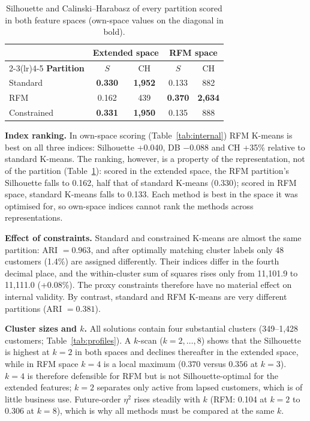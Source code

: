 \documentclass[conference,10pt]{IEEEtran}
\newcommand{\etasq}{\eta^{2}}
\begin{document}
\begin{table}[t]
\centering
\caption{Silhouette and Calinski--Harabasz of every partition scored in
both feature spaces (own-space values on the diagonal in bold).}
\label{tab:cross}
\footnotesize
\setlength{\tabcolsep}{4pt}
\begin{tabular}{lcccc}
\toprule
 & \multicolumn{2}{c}{\textbf{Extended space}} & \multicolumn{2}{c}{\textbf{RFM space}}\\
\cmidrule(lr){2-3}\cmidrule(lr){4-5}
\textbf{Partition} & $S$ & CH & $S$ & CH\\
\midrule
Standard    & \textbf{0.330} & \textbf{1,952} & 0.133 & 882\\
RFM         & 0.162 & 439 & \textbf{0.370} & \textbf{2,634}\\
Constrained & \textbf{0.331} & \textbf{1,950} & 0.135 & 888\\
\bottomrule
\end{tabular}
\end{table}

\textbf{Index ranking.} In own-space scoring (Table~\ref{tab:internal}) RFM K-means is best on all three indices: Silhouette
+0.040, DB $-0.088$ and CH +35\% relative to standard K-means. The ranking,
however, is a property of the representation, not of the partition
(Table~\ref{tab:cross}): scored in the extended space, the RFM partition's
Silhouette falls to 0.162, half that of standard K-means (0.330); scored in
RFM space, standard K-means falls to 0.133. Each method is best in the space
it was optimised for, so own-space indices cannot rank the methods across
representations.


\textbf{Effect of constraints.} Standard and constrained K-means are almost the same
partition: ARI $=0.963$, and after optimally matching cluster labels only
48 customers (1.4\%) are assigned differently. Their indices differ in the
fourth decimal place, and the within-cluster sum of squares rises only from
11,101.9 to 11,111.0 (+0.08\%). The proxy constraints therefore have no
material effect on internal validity. By contrast, standard and RFM K-means
are very different partitions (ARI $=0.381$).

\textbf{Cluster sizes and $k$.} All solutions contain four substantial clusters (349--1,428
customers; Table~\ref{tab:profiles}). A $k$-scan ($k=2,\dots,8$) shows
that the Silhouette is highest at $k=2$ in both spaces and declines
thereafter in the extended space, while in RFM space $k=4$ is a local maximum
($0.370$ versus $0.356$ at $k=3$). $k=4$ is therefore defensible for RFM but
is not Silhouette-optimal for the extended features; $k=2$ separates only
active from lapsed customers, which is of little business use. Future-order
$\etasq$ rises steadily with $k$ (RFM: 0.104 at $k=2$ to 0.306 at $k=8$),
which is why all methods must be compared at the same $k$.
\end{document}
